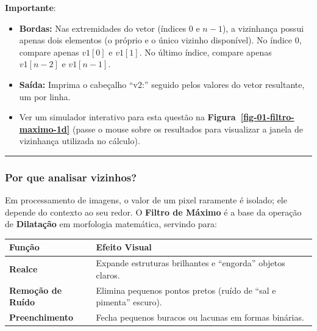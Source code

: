 \documentclass[
  portuguese,
  letterpaper,
  openany,
  oneside,
  12pt,
  a4paper]{book}
\providecommand{\tightlist}{%
  \setlength{\itemsep}{0pt}\setlength{\parskip}{0pt}}
\begin{document}
\begin{tcolorbox}
 \textbf{Importante}:

\begin{itemize}
\tightlist
\item
  \textbf{Bordas:} Nas extremidades do vetor (índices \(0\) e \(n-1\)),
  a vizinhança possui apenas dois elementos (o próprio e o único vizinho
  disponível). No índice \(0\), compare apenas \(v1[0]\) e \(v1[1]\). No
  último índice, compare apenas \(v1[n-2]\) e \(v1[n-1]\).
\item
  \textbf{Saída:} Imprima o cabeçalho ``v2:'' seguido pelos valores do
  vetor resultante, um por linha.
\item
  Ver um simulador interativo para esta questão na
  \textbf{Figura~\ref{fig-01-filtro-maximo-1d}} (passe o mouse sobre os
  resultados para visualizar a janela de vizinhança utilizada no
  cálculo).
\end{itemize}

\begin{center}\rule{0.5\linewidth}{0.5pt}\end{center}

\subsubsection{\texorpdfstring{ Por que analisar
vizinhos?}{ Por que analisar vizinhos?}}\label{por-que-analisar-vizinhos}

Em processamento de imagens, o valor de um pixel raramente é isolado;
ele depende do contexto ao seu redor. O \textbf{Filtro de Máximo} é a
base da operação de \textbf{Dilatação} em morfologia matemática,
servindo para:

\begin{longtable}[]{@{}
  >{\raggedright\arraybackslash}p{}
  >{\raggedright\arraybackslash}p{}@{}}
\toprule\noalign{}
\begin{minipage}[b]{\linewidth}\raggedright
Função
\end{minipage} & \begin{minipage}[b]{\linewidth}\raggedright
Efeito Visual
\end{minipage} \\
\midrule\noalign{}
\endhead
\bottomrule\noalign{}
\endlastfoot
\textbf{Realce} & Expande estruturas brilhantes e ``engorda'' objetos
claros. \\
\textbf{Remoção de Ruído} & Elimina pequenos pontos pretos (ruído de
``sal e pimenta'' escuro). \\
\textbf{Preenchimento} & Fecha pequenos buracos ou lacunas em formas
binárias. \\
\end{longtable}


\end{tcolorbox}
\end{document}
